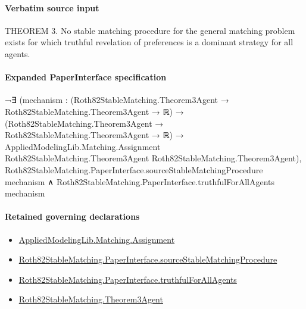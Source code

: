 \documentclass[10pt]{article}
\begin{document}
\paragraph{Verbatim source input}
\begin{ReviewVerbatim}
THEOREM 3. No stable matching procedure for the general matching problem exists
for which truthful revelation of preferences is a dominant strategy for all agents.
\end{ReviewVerbatim}



\paragraph{Expanded PaperInterface specification}
\begin{ReviewVerbatim}
¬∃ (mechanism :
    (Roth82StableMatching.Theorem3Agent → Roth82StableMatching.Theorem3Agent → ℝ) →
      (Roth82StableMatching.Theorem3Agent → Roth82StableMatching.Theorem3Agent → ℝ) →
        AppliedModelingLib.Matching.Assignment Roth82StableMatching.Theorem3Agent Roth82StableMatching.Theorem3Agent),
    Roth82StableMatching.PaperInterface.sourceStableMatchingProcedure mechanism ∧
      Roth82StableMatching.PaperInterface.truthfulForAllAgents mechanism
\end{ReviewVerbatim}

\paragraph{Retained governing declarations}
\begin{itemize}\raggedright
\item \hyperlink{governing-declaration-508c084086b006b8}{Applied\allowbreak{}Modeling\allowbreak{}Lib.\allowbreak{}Matching.\allowbreak{}Assignment}
\item \hyperlink{paper-prerequisite-38b3f3ba417296e2}{Roth82\allowbreak{}Stable\allowbreak{}Matching.\allowbreak{}Paper\allowbreak{}Interface.\allowbreak{}source\allowbreak{}Stable\allowbreak{}Matching\allowbreak{}Procedure}
\item \hyperlink{paper-prerequisite-a52c1e717dd94cee}{Roth82\allowbreak{}Stable\allowbreak{}Matching.\allowbreak{}Paper\allowbreak{}Interface.\allowbreak{}truthful\allowbreak{}For\allowbreak{}All\allowbreak{}Agents}
\item \hyperlink{governing-declaration-0c153381badbbb56}{Roth82\allowbreak{}Stable\allowbreak{}Matching.\allowbreak{}Theorem3\allowbreak{}Agent}
\end{itemize}
\end{document}
